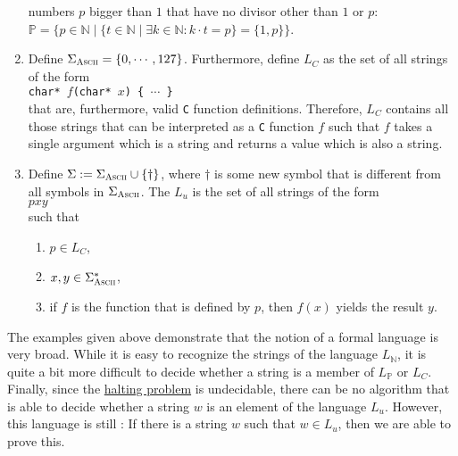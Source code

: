 \begin{enumerate}
      numbers $p$ bigger than $1$ that have no divisor other than $1$ or $p$:
      \\[0.2cm]
      \hspace*{1.3cm}
      $\mathbb{P} = \bigl\{ p \in \mathbb{N} \;\big|\; \{ t \in \mathbb{N} \mid \exists k \in
      \mathbb{N} : k \cdot t = p \} = \{1, p\} \bigr\}$.
\item Define $\Sigma_{\textsc{\scriptsize Ascii}} = \{ 0, \cdots, 127\}$.  Furthermore, define $L_C$
      as the set of all strings of the form
      \\[0.2cm]
      \hspace*{1.3cm}
      \texttt{char* $f$(char* $x$) \{ $\cdots$ \}}
      \\[0.2cm]
      that are, furthermore, valid \texttt{C} function definitions.
      Therefore,  $L_C$ contains all those strings that can be interpreted as a \texttt{C} function $f$
      such that $f$ takes a single argument which is a string and returns a value which is also a
      string.
\item Define $\Sigma := \Sigma_{\textsc{\scriptsize Ascii}} \cup \{\dag\}$, where
      $\mathtt{\dag}$ is some new symbol that is different from all symbols in
      $\Sigma_{\textsc{\scriptsize Ascii}}$.
      The   $L_u$ is the set of all strings of the form
      \\[0.2cm]
      \hspace*{1.3cm}
      $p$\dag$x$\dag$y$
      \\[0.2cm]
      such that
      \begin{enumerate}
      \item $p \in L_C$,
      \item $x,y \in \Sigma_{\textsc{Ascii}}^*$,
      \item if $f$ is the function that is defined by $p$, then $f(x)$ yields the result $y$.
            \eox
      \end{enumerate}
\end{enumerate}
The examples given above demonstrate that the notion of a formal language is very broad.
While it is easy to recognize the strings of the language $L_\mathbb{N}$, it is quite a bit more
difficult to decide whether a string is a member of 
$L_\mathbb{P}$ or $L_C$.  Finally, since the
\href{https://en.wikipedia.org/wiki/Halting_problem}{halting problem} is undecidable, there can be 
no algorithm that is able to decide whether a string  
$w$ is an element of the language $L_u$. However, this language is still :  If there is a string
$w$ such that $w \in L_u$, then we are able to prove this.

